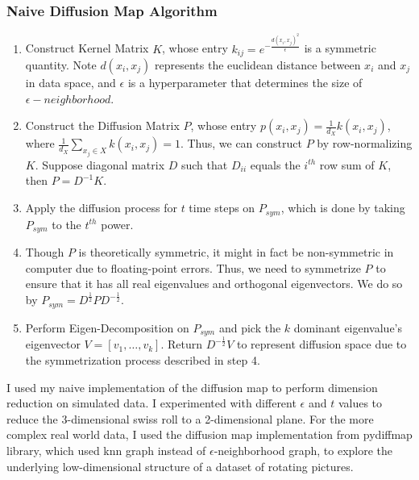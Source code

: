 \documentclass[11pt]{article}
\begin{document}
\subsubsection{Naive Diffusion Map Algorithm}
\begin{enumerate}
    \item Construct Kernel Matrix $K$, whose entry $k_{ij}=e^{-\frac{d(x_i,x_j)^2}{\epsilon}}$ is a symmetric quantity. Note $d(x_i,x_j)$ represents the euclidean distance between $x_i$ and $x_j$ in data space, and $\epsilon$ is a hyperparameter that determines the size of $\epsilon-neighborhood$.
    \item Construct the Diffusion Matrix $P$, whose entry $p(x_i,x_j)=\frac{1}{d_X}k(x_i,x_j)$, where $\frac{1}{d_X}\underset{{x_j\in X}}{\sum}k(x_i,x_j)=1$. Thus, we can construct $P$ by row-normalizing $K$. Suppose diagonal matrix $D$ such that $D_{ii}$ equals the $i^{th}$ row sum of $K$, then $P = D^{-1}K$.
    \item Apply the diffusion process for $t$ time steps on $P_{sym}$,  which is done by taking $P_{sym}$ to the $t^{th}$ power.
    \item Though $P$ is theoretically symmetric, it might in fact be non-symmetric in computer due to floating-point errors. Thus, we need to symmetrize $P$ to ensure that it has all real eigenvalues and orthogonal eigenvectors. We do so by $P_{sym} = D^{\frac{1}{2}}PD^{-\frac{1}{2}}$.
    \item Perform Eigen-Decomposition on $P_{sym}$ and pick the $k$ dominant eigenvalue's eigenvector $V=[v_1,\dots,v_k]$. Return $D^{-\frac{1}{2}}V$ to represent diffusion space due to the symmetrization process described in step 4.
\end{enumerate}
I used my naive implementation of the diffusion map to perform dimension reduction on simulated data. I experimented with different $\epsilon$ and $t$ values to reduce the 3-dimensional swiss roll to a 2-dimensional plane. For the more complex real world data, I used the diffusion map implementation from pydiffmap library, which used knn graph instead of $\epsilon$-neighborhood graph, to explore the underlying low-dimensional structure of a dataset of rotating pictures.  
\
\end{document}
